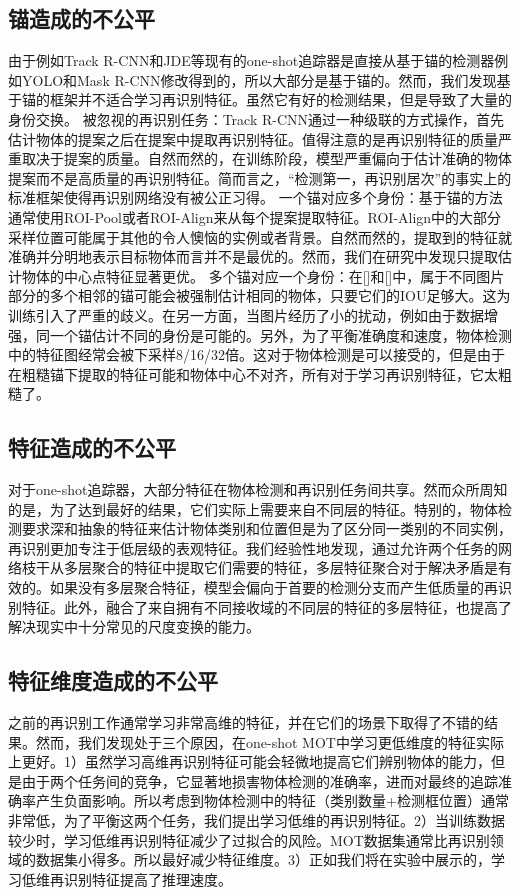 \documentclass{ctexart}
\begin{document}
\subsection{锚造成的不公平}
由于例如Track R-CNN和JDE等现有的one-shot追踪器是直接从基于锚的检测器例如YOLO和Mask R-CNN修改得到的，所以大部分是基于锚的。然而，我们发现基于锚的框架并不适合学习再识别特征。虽然它有好的检测结果，但是导致了大量的身份交换。\newline
被忽视的再识别任务：Track R-CNN通过一种级联的方式操作，首先估计物体的提案之后在提案中提取再识别特征。值得注意的是再识别特征的质量严重取决于提案的质量。自然而然的，在训练阶段，模型严重偏向于估计准确的物体提案而不是高质量的再识别特征。简而言之，“检测第一，再识别居次”的事实上的标准框架使得再识别网络没有被公正习得。\newline
一个锚对应多个身份：基于锚的方法通常使用ROI-Pool或者ROI-Align来从每个提案提取特征。ROI-Align中的大部分采样位置可能属于其他的令人懊恼的实例或者背景。自然而然的，提取到的特征就准确并分明地表示目标物体而言并不是最优的。然而，我们在研究中发现只提取估计物体的中心点特征显著更优。\newline
多个锚对应一个身份：在[]和[]中，属于不同图片部分的多个相邻的锚可能会被强制估计相同的物体，只要它们的IOU足够大。这为训练引入了严重的歧义。在另一方面，当图片经历了小的扰动，例如由于数据增强，同一个锚估计不同的身份是可能的。另外，为了平衡准确度和速度，物体检测中的特征图经常会被下采样8/16/32倍。这对于物体检测是可以接受的，但是由于在粗糙锚下提取的特征可能和物体中心不对齐，所有对于学习再识别特征，它太粗糙了。
\subsection{特征造成的不公平}
对于one-shot追踪器，大部分特征在物体检测和再识别任务间共享。然而众所周知的是，为了达到最好的结果，它们实际上需要来自不同层的特征。特别的，物体检测要求深和抽象的特征来估计物体类别和位置但是为了区分同一类别的不同实例，再识别更加专注于低层级的表观特征。我们经验性地发现，通过允许两个任务的网络枝干从多层聚合的特征中提取它们需要的特征，多层特征聚合对于解决矛盾是有效的。如果没有多层聚合特征，模型会偏向于首要的检测分支而产生低质量的再识别特征。此外，融合了来自拥有不同接收域的不同层的特征的多层特征，也提高了解决现实中十分常见的尺度变换的能力。
\subsection{特征维度造成的不公平}
之前的再识别工作通常学习非常高维的特征，并在它们的场景下取得了不错的结果。然而，我们发现处于三个原因，在one-shot MOT中学习更低维度的特征实际上更好。1）虽然学习高维再识别特征可能会轻微地提高它们辨别物体的能力，但是由于两个任务间的竞争，它显著地损害物体检测的准确率，进而对最终的追踪准确率产生负面影响。所以考虑到物体检测中的特征（类别数量+检测框位置）通常非常低，为了平衡这两个任务，我们提出学习低维的再识别特征。2）当训练数据较少时，学习低维再识别特征减少了过拟合的风险。MOT数据集通常比再识别领域的数据集小得多。所以最好减少特征维度。3）正如我们将在实验中展示的，学习低维再识别特征提高了推理速度。
\end{document}
